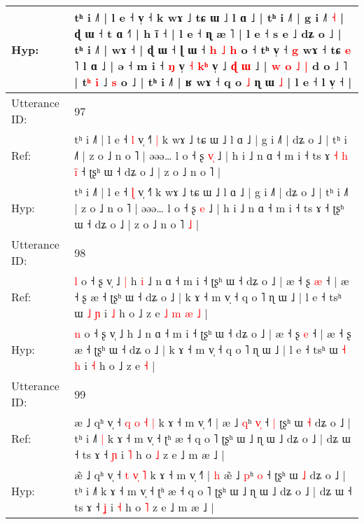 \documentclass[10pt]{article}
\DeclareRobustCommand{\hl}[1]{{\textcolor{red}{#1}}}
\begin{document}
\begin{longtable}{ll}
 \\
Hyp: & tʰ i ˩˥ | l e ˧\hl{}\hl{} v̩ ˧\hl{}\hl{}\hl{} k wɤ ˩ tɕ ɯ ˩ l ɑ ˩ | tʰ i ˩˥ | g i ˩˥\hl{}\hl{}\hl{}\hl{}\hl{}\hl{}\hl{} \hl{˧} | ɖ ɯ ˧ t ɑ ˧˥ | h ĩ ˧ | l e ˧ ɳ æ \hl{}˥ | l e ˧ s e ˩ dʑ o ˩ | tʰ i ˩˥ |\hl{}\hl{} wɤ ˧ | ɖ ɯ ˧ ɭ ɯ ˧\hl{ }\hl{h}\hl{ }\hl{˩} \hl{h} o ˧ tʰ v̩ ˧ \hl{g} wɤ ˧ tɕ \hl{e} ˥ l ɑ ˩ | ə ˧ m i ˧ \hl{ŋ} v̩\hl{}\hl{}\hl{}\hl{} \hl{˧} \hl{}\hl{k}\hl{ʰ} v̩ ˩ \hl{}\hl{ɖ} \hl{ɯ} ˩ | \hl{w} \hl{o}\hl{ }\hl{˩} \hl{|} d o ˩\hl{ }˥ | t\hl{ʰ} \hl{i} ˩ \hl{s} o ˩ | tʰ i ˩˥ | ʁ wɤ ˧ q o \hl{˩} ɳ ɯ \hl{˩} | l e ˧ l v̩ ˧\hl{} |
 \\
\midrule
Utterance ID: & 97 \\
Ref: & tʰ i ˩˥ | l e ˧ \hl{l} v̩ ˧˥\hl{ }\hl{|} k wɤ ˩ tɕ ɯ ˩ l ɑ ˩ | g i ˩˥ | dʑ o ˩ | tʰ i ˩˥ | z o ˩ n o ˥ | əəə… l o ˧ ʂ \hl{v}\hl{̩} ˩ | h i ˩ n ɑ ˧ m i ˧ ts ɤ\hl{ }\hl{˧}\hl{ }\hl{h}\hl{ }\hl{i}\hl{̃} ˧ ʈʂʰ ɯ ˧ dʑ o ˩ | z o ˩ n o ˥\hl{}\hl{} |
 \\
Hyp: & tʰ i ˩˥ | l e ˧ \hl{ɭ} v̩ ˧˥\hl{}\hl{} k wɤ ˩ tɕ ɯ ˩ l ɑ ˩ | g i ˩˥ | dʑ o ˩ | tʰ i ˩˥ | z o ˩ n o ˥ | əəə… l o ˧ ʂ \hl{}\hl{e} ˩ | h i ˩ n ɑ ˧ m i ˧ ts ɤ\hl{}\hl{}\hl{}\hl{}\hl{}\hl{}\hl{} ˧ ʈʂʰ ɯ ˧ dʑ o ˩ | z o ˩ n o ˥\hl{ }\hl{˩} |
 \\
\midrule
Utterance ID: & 98 \\
Ref: & \hl{l} o ˧ ʂ v̩ ˩\hl{ }\hl{|} h\hl{ }\hl{i} ˩ n ɑ ˧ m i ˧ ʈʂʰ ɯ ˧ dʑ o ˩ | æ ˧ ʂ \hl{æ} ˧ | æ ˧ ʂ æ ˧ ʈʂʰ ɯ ˧ dʑ o ˩ | k ɤ ˧ m v̩ ˧ q o ˥ ɳ ɯ ˩ | l e ˧ tsʰ ɯ \hl{˩} \hl{ɲ} i \hl{˩} h o ˩ z e\hl{ }\hl{˩}\hl{ }\hl{m}\hl{ }\hl{æ} \hl{˩} |
 \\
Hyp: & \hl{n} o ˧ ʂ v̩ ˩\hl{}\hl{} h\hl{}\hl{} ˩ n ɑ ˧ m i ˧ ʈʂʰ ɯ ˧ dʑ o ˩ | æ ˧ ʂ \hl{e} ˧ | æ ˧ ʂ æ ˧ ʈʂʰ ɯ ˧ dʑ o ˩ | k ɤ ˧ m v̩ ˧ q o ˥ ɳ ɯ ˩ | l e ˧ tsʰ ɯ \hl{˧} \hl{h} i \hl{˧} h o ˩ z e\hl{}\hl{}\hl{}\hl{}\hl{}\hl{} \hl{˧} |
 \\
\midrule
Utterance ID: & 99 \\
Ref: & æ\hl{} ˩ qʰ v̩ ˧ \hl{q} \hl{o}\hl{ }\hl{˧} \hl{|} k ɤ ˧ m v̩ ˧˥ |\hl{}\hl{} æ\hl{} ˩ \hl{q}ʰ \hl{v}\hl{̩} ˧\hl{ }\hl{|} ʈʂʰ ɯ \hl{˧} dʑ o ˩ | tʰ i ˩˥\hl{ }\hl{|} k ɤ ˧ m v̩ ˧ ʈʰ æ ˧ q o ˥ ʈʂʰ ɯ ˩ ɳ ɯ ˩ dʑ o ˩ | dʑ ɯ ˧ ts ɤ ˧ \hl{ɲ} i \hl{˥} h o \hl{˩} z e ˩ m æ ˩ |
 \\
Hyp: & æ\hl{̃} ˩ qʰ v̩ ˧ \hl{t} \hl{}\hl{v}\hl{̩} \hl{˥} k ɤ ˧ m v̩ ˧˥ |\hl{ }\hl{h} æ\hl{̃} ˩ \hl{p}ʰ \hl{}\hl{o} ˧\hl{}\hl{} ʈʂʰ ɯ \hl{˩} dʑ o ˩ | tʰ i ˩˥\hl{}\hl{} k ɤ ˧ m v̩ ˧ ʈʰ æ ˧ q o ˥ ʈʂʰ ɯ ˩ ɳ ɯ ˩ dʑ o ˩ | dʑ ɯ ˧ ts ɤ ˧ \hl{ʝ} i \hl{˧} h o \hl{˥} z e ˩ m æ ˩ |
 \\

\end{longtable}
\end{document}
